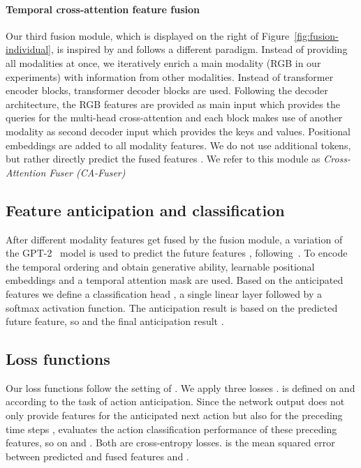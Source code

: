 \documentclass[10pt,twocolumn,letterpaper,dvipsnames]{article}
\begin{document}
\paragraph{Temporal cross-attention feature fusion}
Our third fusion module, which is displayed on the right of Figure~\ref{fig:fusion-individual}, is inspired by \cite{huang2020multimodal} and follows a different paradigm. Instead of providing all modalities at once, we iteratively enrich a main modality (RGB in our experiments) with information from other modalities. Instead of  transformer encoder blocks,  transformer decoder blocks \cite{vaswaniAttentionAllYou2017} are used. Following the decoder architecture, the RGB features  are provided as main input which provides the queries for the multi-head cross-attention and each block makes use of another modality  as second decoder input which provides the keys and values. Positional embeddings are added to all modality features. We do not use additional tokens, but rather directly predict the fused features . We refer to this module as \emph{Cross-Attention Fuser (CA-Fuser)}

\subsection{Feature anticipation and classification}
\label{sec:classification}
After different modality features get fused by the fusion module, a variation of the GPT-2~\cite{radford2019language} model is used to predict the future features , following~\cite{girdharAnticipativeVideoTransformer2021}. To encode the temporal ordering and obtain generative ability, learnable positional embeddings and a temporal attention mask are used.
Based on the anticipated features  we define a classification head , a single linear layer followed by a softmax activation function. The anticipation result is based on the predicted future feature, so  and the final anticipation result .

\subsection{Loss functions}
\label{sec:losses}
Our loss functions follow the setting of \cite{girdharAnticipativeVideoTransformer2021}. We apply three losses .
 is defined on  and  according to the task of action anticipation. Since the network output does not only provide features  for the anticipated next action but also for the preceding time steps ,    evaluates the action classification performance of these preceding features, so on  and . Both are cross-entropy losses.  is the mean squared error between predicted and fused features  and .
\end{document}
